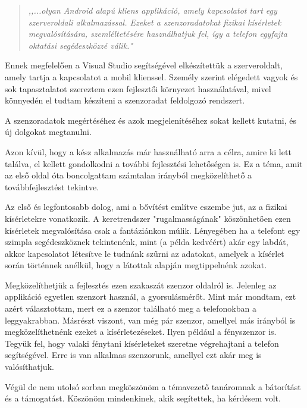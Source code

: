 \documentclass{thesis-ekf}
\theoremstyle{definition}
\theoremstyle{remark}
\begin{document}
\begin{quote}
	\it ,,...olyan Android alapú kliens applikáció, amely kapcsolatot tart egy szerveroldali alkalmazással. Ezeket a szenzoradatokat fizikai kísérletek megvalósítására, szemléltetésére használhatjuk fel, így a telefon egyfajta oktatási segédeszközzé válik."
\end{quote}
Ennek megfelelően a Visual Studio segítségével elkészítettük a szerveroldalt, amely tartja a kapcsolatot a mobil klienssel. Személy szerint elégedett vagyok és sok tapasztalatot szereztem ezen fejlesztői környezet használatával, mivel könnyedén el tudtam készíteni a szenzoradat feldolgozó rendszert.
\par A szenzoradatok megértéséhez és azok megjelenítéséhez sokat kellett kutatni, és új dolgokat megtanulni.
\par Azon kívül, hogy a kész alkalmazás már használható arra a célra, amire ki lett találva, el kellett gondolkodni a további fejlesztési lehetőségen is. Ez a téma, amit az első oldal óta boncolgattam számtalan irányból megközelíthető a továbbfejlesztést tekintve.
\par Az első és legfontosabb dolog, ami a bővítést említve eszembe jut, az a fizikai kísérletekre vonatkozik. A keretrendszer "rugalmasságának" köszönhetően ezen kísérletek megvalósítása csak a fantáziánkon múlik. Lényegében ha a telefont egy szimpla segédeszköznek tekintenénk, mint (a példa kedvéért) akár egy labdát, akkor kapcsolatot létesítve le tudnánk szűrni az adatokat, amelyek a kísérlet során történnek anélkül, hogy a látottak alapján megtippelnénk azokat.
\par Megközelíthetjük a fejlesztés ezen szakaszát szenzor oldalról is. Jelenleg az applikáció egyetlen szenzort használ, a gyorsulásmérőt. Mint már mondtam, ezt azért választottam, mert ez a szenzor található meg a telefonokban a leggyakrabban. Másrészt viszont, van még pár szenzor, amellyel más irányból is megközelíthetnénk ezeket a kísérletezéseket. Ilyen például a fényszenzor is. Tegyük fel, hogy valaki fénytani kísérleteket szeretne végrehajtani a telefon segítségével. Erre is van alkalmas szenzorunk, amellyel ezt akár meg is valósíthatjuk.
\par Végül de nem utolsó sorban megköszönöm a témavezető tanáromnak a bátorítást és a támogatást. Köszönöm mindenkinek, akik segítettek, ha kérdésem volt.
\end{document}
